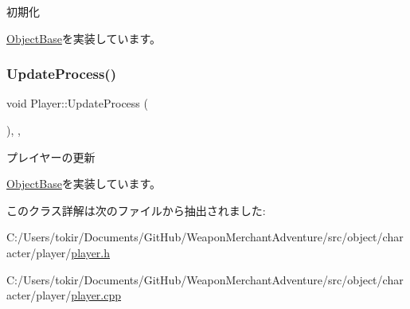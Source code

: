 初期化 



\mbox{\hyperlink{class_object_base_af133f36f2bca1dcfd962e2cfac61ab51}{Object\+Base}}を実装しています。

\mbox{\label{class_player_ab8accc9b83b030f5313f1b4872a7e634}} 
\subsubsection{\texorpdfstring{Update\+Process()}{UpdateProcess()}}
{\footnotesize\ttfamily void Player\+::\+Update\+Process (\begin{DoxyParamCaption}{ }\end{DoxyParamCaption})\hspace{0.3cm}{\ttfamily [final]}, {\ttfamily [protected]}, {\ttfamily [virtual]}}



プレイヤーの更新 



\mbox{\hyperlink{class_object_base_a8b5b72b363a419767efde0b0e692ea95}{Object\+Base}}を実装しています。



このクラス詳解は次のファイルから抽出されました\+:\begin{DoxyCompactItemize}
\item 
C\+:/\+Users/tokir/\+Documents/\+Git\+Hub/\+Weapon\+Merchant\+Adventure/src/object/character/player/\mbox{\hyperlink{player_8h}{player.\+h}}\item 
C\+:/\+Users/tokir/\+Documents/\+Git\+Hub/\+Weapon\+Merchant\+Adventure/src/object/character/player/\mbox{\hyperlink{player_8cpp}{player.\+cpp}}\end{DoxyCompactItemize}
